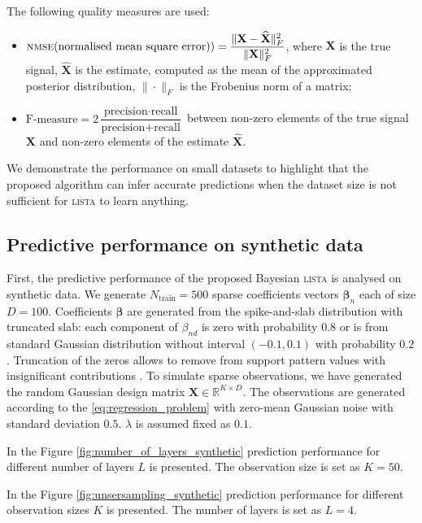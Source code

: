 \documentclass[letterpaper]{article}
\begin{document}
The following quality measures are used:
\begin{itemize}
\item $\text{\textsc{nmse}} (\text{normalised mean square error)})= \dfrac{\|\mathbf{X} - \widehat{\mathbf{X}}\|^2_{F}}{\|\mathbf{X}\|^2_{F}}$, where $\mathbf{X}$ is the true signal, $\widehat{\mathbf{X}}$ is the estimate, computed as the mean of the approximated posterior distribution, $\|\cdot\|_{F}$ is the Frobenius norm of a matrix;
\item $\text{F-measure} = 2\dfrac{\text{precision}\cdot\text{recall}}{\text{precision} + \text{recall}}$ between non-zero elements of the true signal $\mathbf{X}$ and non-zero elements of the estimate $\widehat{\mathbf{X}}$. 
\end{itemize}

We demonstrate the performance on small datasets to highlight that the proposed algorithm can infer accurate predictions when the dataset size is not sufficient for \textsc{lista} to learn anything. 

\subsection{Predictive performance on synthetic data}
First, the predictive performance of the proposed Bayesian \textsc{lista} is analysed on synthetic data. We generate $N_\text{train}=500$ sparse coefficients vectors $\boldsymbol\beta_n$ each of size $D = 100$. Coefficients $\boldsymbol\beta$ are generated from the spike-and-slab distribution with truncated slab: each component of $\beta_{nd}$ is zero with probability $0.8$ or is from standard Gaussian distribution without interval $(-0.1, 0.1)$ with probability $0.2$. Truncation of the zeros allows to remove from support pattern values with insignificant contributions \citep{xin2016maximal}. To simulate sparse observations, we have generated the random Gaussian design matrix $\mathbf{X} \in \mathbb{R}^{K \times D}$.  The observations are generated according to the \ref{eq:regression_problem} with zero-mean Gaussian noise with standard deviation $0.5$. $\lambda$ is assumed fixed as $0.1$.

In the Figure \ref{fig:number_of_layers_synthetic} prediction performance for different number of layers $L$ is presented. The observation size is set as $K=50$. 

In the Figure \ref{fig:unsersampling_synthetic} prediction performance for different observation sizes $K$ is presented. The number of layers is set as $L=4$.
\end{document}
